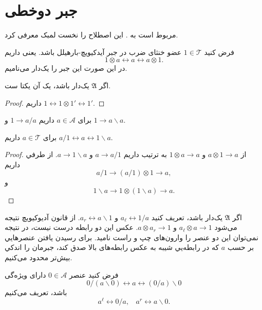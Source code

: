 \section{جبر دوخطی}

مربوط است به
.
این اصطلاح را نخست لمبک معرفی کرد.
\cite{Lambek:Bilinear}

\begin{definition}
فرض کنید
$1 \in \mathcal{T}$
عضو خنثای ضرب در جبر آیدکیویچ-بارهیلل باشد. یعنی داریم
$$ 1 \otimes a \leftrightarrow a \leftrightarrow a \otimes 1. $$
در این صورت این جبر را یک‌دار می‌نامیم.
\end{definition}

\begin{lemma}
\label{lemma:1unique}
اگر 
$\mathfrak{A}$
یک‌دار باشد، یک آن یکتا ست.
\end{lemma}
\begin{proof}
داریم
$1 \leftrightarrow 1 \otimes 1' \leftrightarrow 1'$.
\end{proof}

\begin{proposition}
\label{proposition:element1-1}
برای 
$a \in \mathcal{A}$
داریم
$1 \rightarrow a / a$ 
و
$1 \rightarrow a \backslash a$.
\end{proposition}

\begin{theorem}
\label{lemma:element1-2}
برای
$a \in \mathcal{T}$
داریم
$a/1 \leftrightarrow a \leftrightarrow 1 \backslash a$.
\end{theorem}
\begin{proof}
از 
$a \otimes 1 \rightarrow a$
و
$1 \otimes a \rightarrow a$
به ترتیب داریم
$a \rightarrow a / 1$
و
$a \rightarrow 1 \backslash a$.
از طرفي داریم
\[ a/1 \rightarrow (a/1) \otimes 1 \rightarrow a, \]
و
\[ 1 \backslash a \rightarrow 1 \otimes (1 \backslash a) \rightarrow a. \]
\end{proof}

اگر 
$\mathfrak{A}$
یک‌دار باشد، تعریف کنید
$a_\ell \leftrightarrow 1 / a$
و
$a_r \leftrightarrow a \backslash 1$.
از قانون آدیوکیویچ نتیجه می‌شود
$a_\ell \otimes a \rightarrow 1$
و
$a \otimes a_r \rightarrow 1$.
عکس این دو رابطه درست نیست، در نتیجه نمی‌توان این دو عنصر را وارون‌های چپ و راست نامید.
برای رسیدن یافتن عنصرهایي بر حسب
$a$
که در رابطه‌یي شیبه به عکس رابطه‌های بالا صدق کند، جبرمان را اندکي بیش‌تر محدود می‌کنیم.

\begin{definition}
فرض کنید عنصر
$0 \in \mathcal{A}$
دارای ویژه‌گی
\[ 0 / (a \backslash 0) \leftrightarrow a \leftrightarrow (0 / a) \backslash 0 \]
باشد، تعریف می‌کنیم
\[ a^\ell \leftrightarrow 0 / a, \ \ \ \  a^r \leftrightarrow a \backslash 0. \]
\end{definition}

